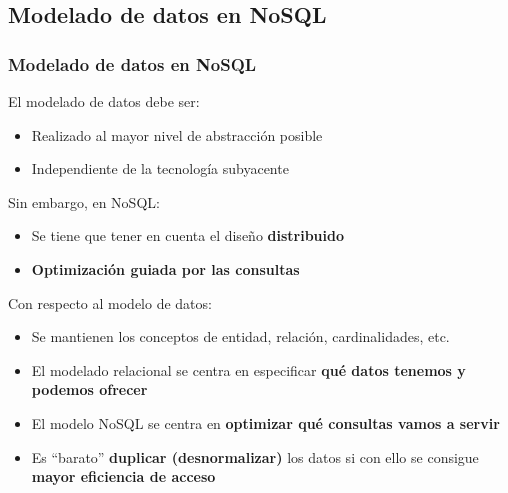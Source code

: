 \documentclass[14pt]{beamer}
\begin{document}


\subsection{Modelado de datos en NoSQL}

\begin{frame}[allowframebreaks]
  \frametitle{Modelado de datos en NoSQL}
El modelado de datos debe ser:
  \begin{itemize}
  \item Realizado al mayor nivel de abstracción posible
  \item Independiente de la tecnología subyacente
  \end{itemize}
Sin embargo, en NoSQL:
  \begin{itemize}
  \item Se tiene que tener en cuenta el diseño {\bf distribuido}
  \item {\bf Optimización guiada por las consultas}
  \end{itemize}

  \framebreak
Con respecto al modelo de datos:

\begin{itemize}
\item Se mantienen los conceptos de entidad, relación, cardinalidades, etc.
\item El modelado relacional se centra en especificar {\bf qué datos
    tenemos y podemos ofrecer}
\item El modelo NoSQL se centra en {\bf optimizar qué
    consultas vamos a servir}
\item Es ``barato'' {\bf duplicar (desnormalizar)} los datos si con ello se
  consigue {\bf mayor eficiencia de acceso}
\end{itemize}

\end{frame}
\end{document}
